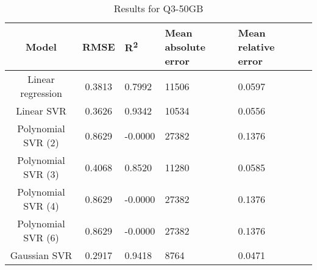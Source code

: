 \begin{table}[H]
\centering
\begin{adjustbox}{center}
\begin{tabular}{c | c M{1.2cm} M{2.5cm} M{2.5cm} M{1.8cm}}
Model & RMSE & R\textsuperscript{2} & Mean absolute error & Mean relative error \tabularnewline
\hline
Linear regression & 0.3813 & 0.7992 &  11506 & 0.0597 \\
Linear SVR & 0.3626 & 0.9342 &  10534 & 0.0556 \\
Polynomial SVR (2) & 0.8629 & -0.0000 &  27382 & 0.1376 \\
Polynomial SVR (3) & 0.4068 & 0.8520 &  11280 & 0.0585 \\
Polynomial SVR (4) & 0.8629 & -0.0000 &  27382 & 0.1376 \\
Polynomial SVR (6) & 0.8629 & -0.0000 &  27382 & 0.1376 \\
Gaussian SVR & 0.2917 & 0.9418 &   8764 & 0.0471 \\
\end{tabular}
\end{adjustbox}
\\
\caption{Results for Q3-50GB}
\label{tab:all_linear_Q3_50}
\end{table}
